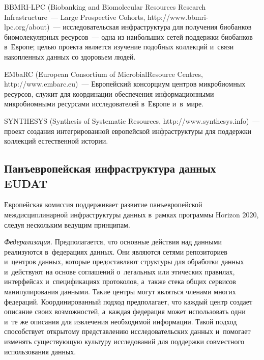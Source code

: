 \begin{multicols}{2}
  BBMRI-LPC (Biobanking and Biomolecular Resources Research Infrastructure~--- Large 
Prospective Cohorts, {\sf http://www.bbmri-lpc.org/about})~--- исследовательская 
инфраструктура для получения биобанков биомолекулярных ресурсов~--- одна из 
наибольших сетей поддержки биобанков в~Европе; \mbox{целью} проекта является изучение 
подобных коллекций и~связи накопленных данных со здоровьем людей.
  
  EMbaRC (European Consortium of Microbial\linebreak Resource Centres, {\sf http://www.embarc.eu})~--- 
Европейский консорциум центров микробиомных ресурсов, служит для координации 
обеспечения информацион\-ными микробиомными ресурсами исследователей в~Европе 
и~в~мире.
  
  SYNTHESYS (Synthesis of Systematic Resources, {\sf http://www.synthesys.info})~--- 
  проект  создания интегрированной европейской инфраструктуры для поддержки коллекций 
естественной истории.

\columnbreak

\subsection{Панъевропейская инфраструктура данных EUDAT}


  Европейская комиссия поддерживает развитие панъевропейской междисциплинарной 
инфраструктуры данных в~рамках программы Horizon 2020, следуя нескольким ведущим 
принципам. 

  
  \textit{Федерализация.} Предполагается, что основные действия над данными 
реализуются в~федерациях данных. Они являются сетями репозиториев и~центров данных, 
которые предоставляют структуры для обработки данных и~действуют на основе 
соглашений о~легальных или этических правилах, интерфейсах и~спецификациях 
протоколов, а~также стека общих сервисов манипулирования данными. Такие центры 
могут являться членами многих федераций. Координированный подход предполагает, что 
каждый центр создает описание своих возможностей, а~каждая федерация может 
использовать одни и~те же описания для извлечения необходимой информации. Такой 
подход способствует открытому представлению исследовательских данных и~помогает 
изменять существующую культуру исследований для поддержки совместного 
использования данных. 

  

\end{multicols}
